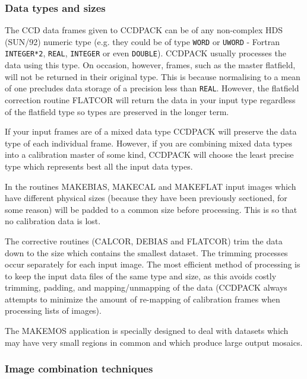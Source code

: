 \documentclass[twoside,11pt]{article}
\newcommand{\htmlref}[2]{#1}
\renewcommand{\_}{\texttt{\symbol{95}}}
\newcommand{\text}[1]{{\small \tt #1}}
\newcommand{\xroutine}[1]{\htmlref{{\sc #1}}{#1}}
\begin{document}
\subsubsection{Data types and sizes}

The CCD data frames given to CCDPACK can be of any non-complex HDS
(SUN/92) numeric type (e.g. they could be of type \text{\_WORD} or
\text{\_UWORD} - Fortran \text{INTEGER*2}, \text{\_REAL},
\text{\_INTEGER} or even  \text{\_DOUBLE}). CCDPACK usually processes
the data using this type. On occasion, however, frames, such as the
master flatfield, will not be returned in their original type. This is
because normalising to a mean of one precludes data storage of a
precision less than \text{\_REAL}. However, the flatfield correction routine
\xroutine{FLATCOR} will return the data in your input type regardless of the
flatfield type so types are preserved in the longer term.

If your input frames are of a mixed data type CCDPACK will preserve the data
type of each individual frame. However, if you are combining mixed data types
into a calibration master of some kind, CCDPACK will choose the least precise
type which represents best all the input data types.

In the routines \xroutine{MAKEBIAS}, \xroutine{MAKECAL} and
\xroutine{MAKEFLAT} input images which have
different physical sizes (because they have been previously sectioned,
for some reason) will be padded to a common size before processing. This
is so that no calibration data is lost.

The corrective routines (\xroutine{CALCOR}, \xroutine{DEBIAS} and \xroutine{FLATCOR}) trim the data down
to the size which contains the smallest dataset. The trimming processes
occur separately for each input image. The most efficient method of
processing is to keep the input data files of the same type and size, as
this avoids costly trimming, padding, and mapping/unmapping of the data
(CCDPACK always attempts to minimize the amount of re-mapping of
calibration frames when processing lists of images).

The \xroutine{MAKEMOS} application is specially designed to deal with datasets
which may have very small regions in common and which produce large
output mosaics.

\subsubsection{Image combination techniques \label{combinations}}
\end{document}

